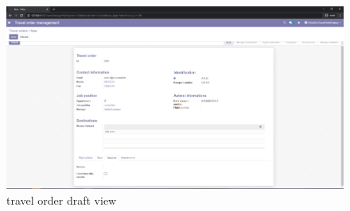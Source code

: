 \begin{figure}[H]
    \centering
    \includegraphics[scale=0.33]{img/c_mission_draft.png}
    \caption{travel order draft view}
    \label{fig:my_label}
\end{figure}

